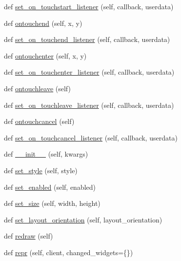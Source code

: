 \begin{DoxyCompactItemize}
\item 
def \hyperlink{classremi_1_1gui_1_1Widget_a8d05b17a4f760df749dc434b797a0600}{set\+\_\+on\+\_\+touchstart\+\_\+listener} (self, callback, userdata)
\item 
def \hyperlink{classremi_1_1gui_1_1Widget_a1b179a88f650a3f54f692828027fdcb5}{ontouchend} (self, x, y)
\item 
def \hyperlink{classremi_1_1gui_1_1Widget_a5af31755de7de54804bc67259f994bb4}{set\+\_\+on\+\_\+touchend\+\_\+listener} (self, callback, userdata)
\item 
def \hyperlink{classremi_1_1gui_1_1Widget_a31b555dced51b4769d55bc04d91805c5}{ontouchenter} (self, x, y)
\item 
def \hyperlink{classremi_1_1gui_1_1Widget_a458116299aad9c6b33cd5d993d9998f5}{set\+\_\+on\+\_\+touchenter\+\_\+listener} (self, callback, userdata)
\item 
def \hyperlink{classremi_1_1gui_1_1Widget_aade8a45979f4b26a387ed25442f8e89d}{ontouchleave} (self)
\item 
def \hyperlink{classremi_1_1gui_1_1Widget_a36d7cfe63058b831f7b61ecd957714b6}{set\+\_\+on\+\_\+touchleave\+\_\+listener} (self, callback, userdata)
\item 
def \hyperlink{classremi_1_1gui_1_1Widget_a493853f8abce219cca64a11f0485c00b}{ontouchcancel} (self)
\item 
def \hyperlink{classremi_1_1gui_1_1Widget_a6ee5aee53f7266d4cd0cf6b32dae29a7}{set\+\_\+on\+\_\+touchcancel\+\_\+listener} (self, callback, userdata)
\item 
def \hyperlink{classremi_1_1gui_1_1Widget_a019461caad067039a94ba58c97db947f}{\+\_\+\+\_\+init\+\_\+\+\_\+} (self, kwargs)
\item 
def \hyperlink{classremi_1_1gui_1_1Widget_a9b04b4271704bd141203d25ed0f0df1f}{set\+\_\+style} (self, style)
\item 
def \hyperlink{classremi_1_1gui_1_1Widget_a67f9e7bf2a0e8bdf308461e394279f5f}{set\+\_\+enabled} (self, enabled)
\item 
def \hyperlink{classremi_1_1gui_1_1Widget_a7812a9476b73780a273413656ec406ad}{set\+\_\+size} (self, width, height)
\item 
def \hyperlink{classremi_1_1gui_1_1Widget_a96a7d0342b8d9c274c84d32fd4ba9a0b}{set\+\_\+layout\+\_\+orientation} (self, layout\+\_\+orientation)
\item 
def \hyperlink{classremi_1_1gui_1_1Widget_ad0a2d54c3af3cad22d5c0dfef04bf836}{redraw} (self)
\item 
def \hyperlink{classremi_1_1gui_1_1Widget_a67e2320662bd4a6e9705816ba2fff9ae}{repr} (self, client, changed\+\_\+widgets=\{\})

\end{DoxyCompactItemize}
